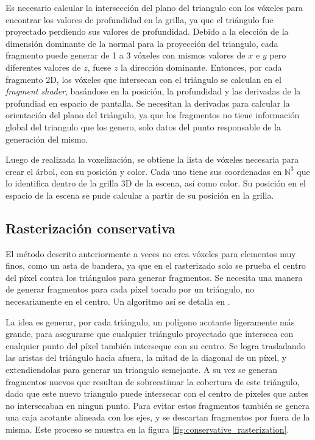 Es necesario calcular la intersección del plano del triangulo con los vóxeles para encontrar los valores de profundidad en la grilla, ya que el triángulo fue proyectado perdiendo sus valores de profundidad.
Debido a la elección de la dimensión dominante de la normal para la proyección del triangulo, cada fragmento puede generar de 1 a 3 vóxeles con mismos valores de $x$ e $y$ pero diferentes valores de $z$, fuese $z$ la dirección dominante. %
Entonces, por cada fragmento 2D, los vóxeles que intersecan con el triángulo se calculan en el \textit{fragment shader}, basándose en la posición, la profundidad y las derivadas de la profundiad en espacio de pantalla. %
Se necesitan la derivadas para calcular la orientación del plano del triángulo, ya que los fragmentos no tiene información global del triangulo que los genero, solo datos del punto responsable de la generación del mismo.

Luego de realizada la voxelización, se obtiene la lista de vóxeles necesaria para crear el árbol, con su posición y color.
Cada uno tiene sus coordenadas en $\mathbb{N}^3$ que lo identifica dentro de la grilla 3D de la escena, así como color.
Su posición en el espacio de la escena se pude calcular a partir de su posición en la grilla.

\subsection{Rasterización conservativa}

El método descrito anteriormente a veces no crea vóxeles para elementos muy finos, como un asta de bandera, ya que en el rasterizado solo se prueba el centro del píxel contra los triángulos para generar fragmentos.
Se necesita una manera de generar fragmentos para cada píxel tocado por un triángulo, no necesariamente en el centro.
Un algoritmo así se detalla en \cite{conservative-rasterization}.

La idea es generar, por cada triángulo, un polígono acotante ligeramente más grande, para asegurarse que cualquier triángulo proyectado que interseca con cualquier punto del píxel también interseque con su centro.
Se logra trasladando las aristas del triángulo hacia afuera, la mitad de la diagonal de un píxel, y extendiendolas para generar un triangulo semejante.
A su vez se generan fragmentos nuevos que resultan de sobreestimar la cobertura de este triángulo, dado que este nuevo triangulo puede intersecar con el centro de píxeles que antes no intersecaban en ningun punto.
Para evitar estos fragmentos también se genera una caja acotante alineada con los ejes, y se descartan fragmentos por fuera de la misma.
Este proceso se muestra en la figura \ref{fig:conservative_rasterization}.

